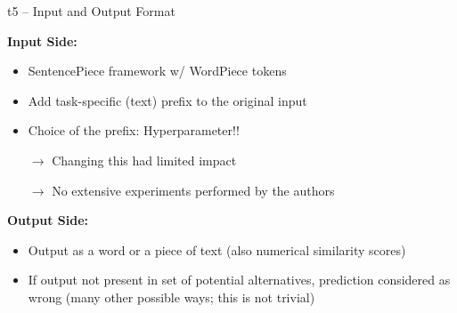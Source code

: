 \begin{frame}{t5 -- Input and Output Format}

\vfill

	\textbf{Input Side:}

	\begin{itemize}
		\item SentencePiece framework w/ WordPiece tokens
		\item Add task-specific (text) prefix to the original input
		\item Choice of the prefix: Hyperparameter!! 
		\item[$\to$] Changing this had limited impact
		\item[$\to$] No extensive experiments performed by the authors
	\end{itemize}
	
	\vspace{.5cm}

	\textbf{Output Side:}

	\begin{itemize}
		\item Output as a word or a piece of text (also numerical similarity scores)
		\item If output not present in set of potential alternatives, prediction considered as wrong (many other possible ways; this is not trivial)
	\end{itemize}
	
\vfill

\end{frame}


